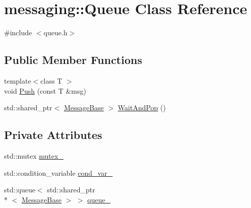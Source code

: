 \hypertarget{classmessaging_1_1Queue}{\section{messaging\-:\-:Queue Class Reference}
\label{classmessaging_1_1Queue}
}


{\ttfamily \#include $<$queue.\-h$>$}

\subsection*{Public Member Functions}
\begin{DoxyCompactItemize}
\item 
{\footnotesize template$<$class T $>$ }\\void \hyperlink{classmessaging_1_1Queue_a8ee0ac353ead8aca910d8073a2d5e16e}{Push} (const T \&msg)
\item 
std\-::shared\-\_\-ptr$<$ \hyperlink{structmessaging_1_1MessageBase}{Message\-Base} $>$ \hyperlink{classmessaging_1_1Queue_a624adbac8b7f4b5ebf6bb0f9ab76bcc3}{Wait\-And\-Pop} ()
\end{DoxyCompactItemize}
\subsection*{Private Attributes}
\begin{DoxyCompactItemize}
\item 
std\-::mutex \hyperlink{classmessaging_1_1Queue_acb84af14fea49c09597be7ad19f9f3c5}{mutex\-\_\-}
\item 
std\-::condition\-\_\-variable \hyperlink{classmessaging_1_1Queue_aec7510ebff3d15176afdf3d93ca6fdc8}{cond\-\_\-var\-\_\-}
\item 
std\-::queue$<$ std\-::shared\-\_\-ptr\\*
$<$ \hyperlink{structmessaging_1_1MessageBase}{Message\-Base} $>$ $>$ \hyperlink{classmessaging_1_1Queue_aae9c5f0bc7b5be870129c56643404551}{queue\-\_\-}
\end{DoxyCompactItemize}



